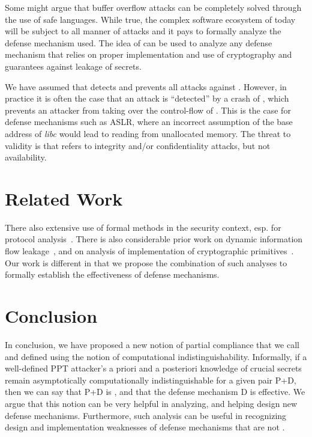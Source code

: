  Some might argue that
buffer overflow attacks can be completely solved through the use of
safe languages. While true, the complex software ecosystem of today
will be subject to all manner of attacks and it pays to formally
analyze the defense mechanism used. The idea of \resistance can be
used to analyze any defense mechanism that relies on proper
implementation and use of cryptography and guarantees against leakage
of secrets.

 We have assumed that 
detects and prevents all attacks against . However, in practice it 
is often the case that an attack is ``detected'' by a crash of , which 
prevents an attacker from taking over the control-flow of . This is
the case for defense mechanisms such as ASLR, where an incorrect 
assumption of the base address of \emph{libc} would lead to reading 
from unallocated memory. The threat to validity is that \resistance 
refers to integrity and/or confidentiality attacks, but not availability.


\section {Related Work}

There also extensive use of formal methods in the security context,
esp. for protocol analysis~\cite{datta2007protocol}. There is also
considerable prior work on dynamic information flow
leakage~\cite{schwartz2010all}, and on analysis of implementation of
cryptographic primitives~\cite{appelverification}. Our work is
different in that we propose the combination of such analyses to
formally establish the effectiveness of defense mechanisms.

\section{Conclusion}

In conclusion, we have proposed a new notion of partial compliance
that we call \resistance and defined using the notion of computational
indistinguishability. Informally, if a well-defined PPT attacker's a
priori and a posteriori knowledge of crucial secrets remain
asymptotically computationally indistinguishable for a given pair P+D,
then we can say that P+D is \resistant, and that the defense mechanism
D is effective. We argue that this notion can be very helpful in
analyzing, and helping design new defense mechanisms. Furthermore,
such analysis can be useful in recognizing design and implementation
weaknesses of defense mechanisms that are not \resistant.

